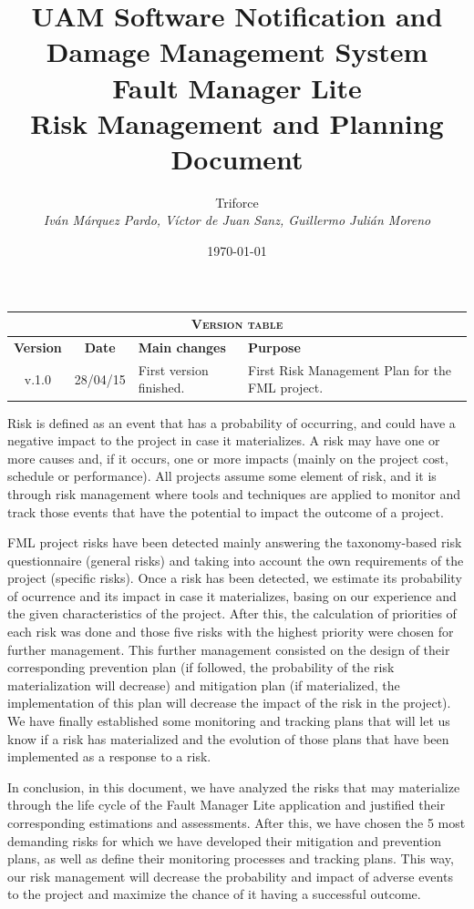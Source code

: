 \documentclass[11pt]{report}
\title{UAM Software Notification and Damage Management System \\ Fault Manager Lite \\ Risk Management and Planning Document}
\date{\today}
\author{{\Large Triforce} \\ \vspace{5pt} \textit{Iván Márquez Pardo, Víctor de Juan Sanz, Guillermo Julián Moreno}}
\newcounter{risks}[subsection]
\begin{document}
\maketitle

\begin{table}[hbtp]
\centering
\begin{tabular}{|c|c|p{3cm}|p{3.5cm}|}
\hline \multicolumn{4}{|c|}{\textsc{Version table}} \\ \hline \hline
\textbf{Version} & \textbf{Date} & \textbf{Main changes} & \textbf{Purpose} \\ \hline
v.1.0 & 28/04/15 & First version finished. & First Risk Management Plan for the FML project. \\ \hline
\end{tabular}
\end{table}


\begin{Summary}

Risk is defined as an event that has a probability of occurring, and could have a negative impact to the project in case it materializes. A risk may have one or more causes and, if it occurs, one or more impacts (mainly on the project cost, schedule or performance). All projects assume some element of risk, and it is through risk management where tools and techniques are applied to monitor and track those events that have the potential to impact the outcome of a project. 

FML project risks have been detected mainly answering the taxonomy-based risk questionnaire (general risks) and taking into account the own requirements of the project (specific risks). Once a risk has been detected, we estimate its probability of ocurrence and its impact in case it materializes, basing on our experience and the given characteristics of the project. After this, the calculation of priorities of each risk was done and those five risks with the highest priority were chosen for further management. This further management consisted on the design of their corresponding prevention plan (if followed, the probability of the risk materialization will decrease) and mitigation plan (if materialized, the implementation of this plan will decrease the impact of the risk in the project). We have finally established some monitoring and tracking plans that will let us know if a risk has materialized and the evolution of those plans that have been implemented as a response to a risk.

In conclusion, in this document, we have analyzed the risks that may materialize through the life cycle of the Fault Manager Lite application and justified their corresponding estimations and assessments. After this, we have chosen the 5 most demanding risks for which we have developed their mitigation and prevention plans, as well as define their monitoring processes and tracking plans. This way, our risk management will decrease the probability and impact of adverse events to the project and maximize the chance of it having a successful outcome.

\end{Summary}
\end{document}
